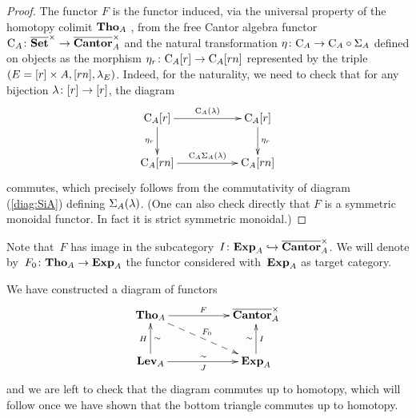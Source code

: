 \begin{proof}
The functor $F$ is the functor induced, via the universal property of the homotopy colimit $\mathbf{Tho}_A$ \cite[Prop 3.21]{Thomason}, from the free Cantor algebra functor 
$\mathrm{C}_A\colon \overline{\mathbf{Set}}^\times\to \overline{\mathbf{Cantor}}_A^\times$ and the natural transformation $\eta\colon \mathrm{C}_A\to \mathrm{C}_A\circ \Sigma_A$ defined on objects as the morphism $\eta_r\colon \mathrm{C}_A[r]\to \mathrm{C}_A[rn]$ represented by the triple 
$(E=[r]\times A,[rn],\lambda_E)$. Indeed, for the naturality, we need to check that for any bijection $\lambda\colon [r]\to [r]$,  the diagram 
$$\xymatrix{\rmC_A[r] \ar[rr]^-{\rmC_A(\la)} \ar[d]_{\eta_r} && \rmC_A[r] \ar[d]^{\eta_r}\\
\rmC_A[rn] \ar[rr]^-{\rmC_A\Si_A(\la)} && \rmC_A[rn] }$$
commutes, which precisely follows from the commutativity of diagram (\ref{diag:SiA}) defining $\Sigma_A(\lambda)$. 
(One can also check directly that $F$ is a symmetric monoidal functor. In fact it is strict symmetric monoidal.) 
\end{proof} 

Note that~$F$ has image in the subcategory~$I\colon\mathbf{Exp}_A\hookrightarrow \overline{\mathbf{Cantor}}_A^\times$. We will denote by~$F_0\colon\mathbf{Tho}_A\to \mathbf{Exp}_A$ the functor considered with~$\mathbf{Exp}_A$ as target category. 

We have constructed a diagram of functors 
\[\xymatrix{\Tho_A \ar[rr]^{F}\ar@{-->}[rrd]^{F_0} & &  \bCan_A^\times\\
\Lev_A \ar[u]^{H}_\sim\ar[rr]_J^\sim &&  \ar[u]_I^\sim \Exp_A }
\]
and we are left to check that the diagram commutes up to homotopy, which will follow once we have shown that the bottom triangle commutes up to homotopy. 

